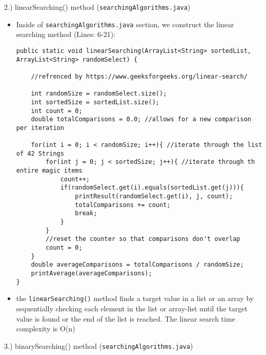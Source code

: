 \documentclass{article}
\begin{document}
\begin{large}
    2.) linearSearching() method (\verb|searchingAlgorithms.java|)
\end{large}


\begin{itemize}
\item Inside of \verb|searchingAlgorithms.java| section, we construct the linear searching method (Lines: 6-21):

\begin{verbatim}
public static void linearSearching(ArrayList<String> sortedList, ArrayList<String> randomSelect) {
    
    //refrenced by https://www.geeksforgeeks.org/linear-search/
    
    int randomSize = randomSelect.size();
    int sortedSize = sortedList.size();
    int count = 0;
    double totalComparisons = 0.0; //allows for a new comparison per iteration
    
    for(int i = 0; i < randomSize; i++){ //iterate through the list of 42 Strings
        for(int j = 0; j < sortedSize; j++){ //iterate through th entire magic items
            count++;
            if(randomSelect.get(i).equals(sortedList.get(j))){	
                printResult(randomSelect.get(i), j, count);					
                totalComparisons += count;
                break;
            }
        }
        //reset the counter so that comparisons don't overlap
        count = 0;
    }
    double averageComparisons = totalComparisons / randomSize;
    printAverage(averageComparisons);
}
\end{verbatim}
\item the \verb|linearSearching()| method finds a target value in a list or an array by sequentially checking each element in the list or array-list until the target value is found or the end of the list is reached. The linear search time complexity is O(n)\\

\end{itemize}

\pagebreak
\begin{large}
    3.) binarySearching() method (\verb|searchingAlgorithms.java|)
\end{large}
\end{document}
